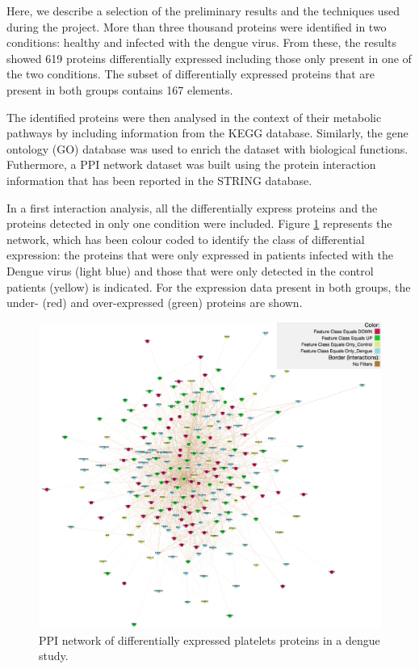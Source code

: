 Here, we describe a selection of the preliminary results and the techniques used during the project. More than three thousand proteins were identified in two conditions: healthy and infected with the dengue virus. From these, the results showed 619 proteins differentially expressed including those only present in one of the two conditions. The subset of differentially expressed proteins that are present in both groups contains 167 elements.

The identified proteins were then analysed in the context of their metabolic pathways by including information from the KEGG database. Similarly, the gene ontology (GO) database was used to enrich the dataset with biological functions.  Futhermore, a PPI network dataset was built using the protein interaction information that has been reported in the STRING database.

In a first interaction analysis, all the differentially express proteins and the proteins detected in only one condition were included. Figure \ref{fig:pinv_platelets_1} represents the network, which has been colour coded to identify the class of differential expression: the proteins that were only expressed in patients infected with the Dengue virus (light blue) and those that were only detected in the control patients (yellow) is indicated. For the expression data present in both groups, the under- (red) and over-expressed (green) proteins are shown.  

\begin{figure}
\centering
\includegraphics[width=\textwidth]{figures/pinv_platelets_1.png}
\caption[PPI network of differentially expressed platelets proteins in a dengue study.]{PPI network of differentially expressed platelets proteins in a dengue study.
\label{fig:pinv_platelets_1}}
\end{figure}

